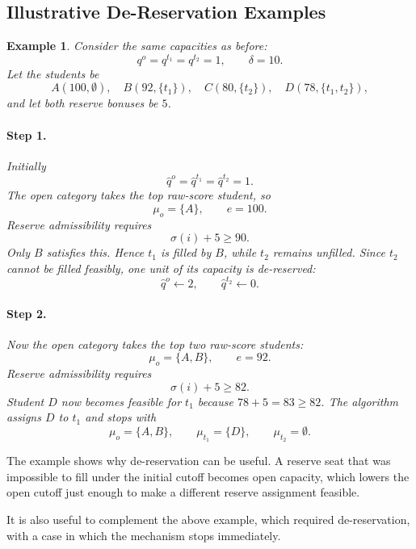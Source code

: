 \documentclass[12pt]{article}
\newtheorem{example}{Example}
\newcommand{\1}{\mathbf{1}}
\begin{document}
\subsection{Illustrative De-Reservation Examples}
\begin{example}
Consider the same capacities as before:
\[
q^o=q^{t_1}=q^{t_2}=1,\qquad \delta=10.
\]
Let the students be
\[
A(100,\emptyset),\quad B(92,\{t_1\}),\quad C(80,\{t_2\}),\quad D(78,\{t_1,t_2\}),
\]
and let both reserve bonuses be $5$.

\paragraph{Step 1.}
Initially
\[
\hat q^o=\hat q^{t_1}=\hat q^{t_2}=1.
\]
The open category takes the top raw-score student, so
\[
\mu_o=\{A\},\qquad e=100.
\]
Reserve admissibility requires
\[
\sigma(i)+5\ge 90.
\]
Only $B$ satisfies this. Hence $t_1$ is filled by $B$, while $t_2$ remains unfilled. Since $t_2$ cannot be filled feasibly, one unit of its capacity is de-reserved:
\[
\hat q^o\gets 2,\qquad \hat q^{t_2}\gets 0.
\]

\paragraph{Step 2.}
Now the open category takes the top two raw-score students:
\[
\mu_o=\{A,B\},\qquad e=92.
\]
Reserve admissibility requires
\[
\sigma(i)+5\ge 82.
\]
Student $D$ now becomes feasible for $t_1$ because $78+5=83\ge 82$. The algorithm assigns $D$ to $t_1$ and stops with
\[
\mu_o=\{A,B\},\qquad \mu_{t_1}=\{D\},\qquad \mu_{t_2}=\emptyset.
\]
\end{example}
The example shows why de-reservation can be useful. A reserve seat that was impossible to fill under the initial cutoff becomes open capacity, which lowers the open cutoff just enough to make a different reserve assignment feasible.

It is also useful to complement the above example, which required de-reservation, with a case in which the mechanism stops immediately.
\end{document}
